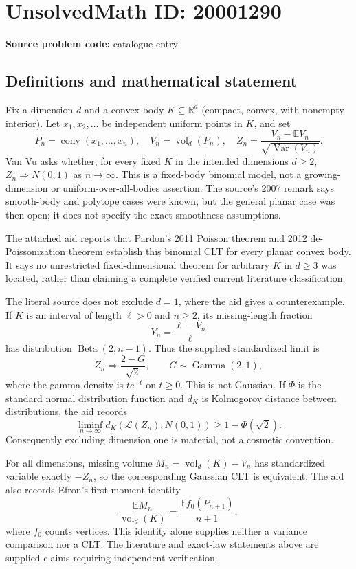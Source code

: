 \documentclass[11pt]{article}
\newcommand{\R}{\mathbb{R}}
\newcommand{\E}{\mathbb{E}}
\begin{document}
\section*{UnsolvedMath ID: 20001290}
\textbf{Source problem code:} catalogue entry
\subsection{Definitions and mathematical statement}
Fix a dimension $d$ and a convex body $K\subseteq\R^d$ (compact, convex, with nonempty interior). Let $x_1,x_2,\ldots$ be independent uniform points in $K$, and set
\[
 P_n=\operatorname{conv}(x_1,\ldots,x_n),\quad V_n=\operatorname{vol}_d(P_n),\quad
 Z_n=\frac{V_n-\E V_n}{\sqrt{\operatorname{Var}(V_n)}}.
\]
Van Vu asks whether, for every fixed $K$ in the intended dimensions $d\geq2$, $Z_n\Rightarrow N(0,1)$ as $n\to\infty$. This is a fixed-body binomial model, not a growing-dimension or uniform-over-all-bodies assertion. The source's 2007 remark says smooth-body and polytope cases were known, but the general planar case was then open; it does not specify the exact smoothness assumptions.

The attached aid reports that Pardon's 2011 Poisson theorem and 2012 de-Poissonization theorem establish this binomial CLT for every planar convex body. It says no unrestricted fixed-dimensional theorem for arbitrary $K$ in $d\geq3$ was located, rather than claiming a complete verified current literature classification.

The literal source does not exclude $d=1$, where the aid gives a counterexample. If $K$ is an interval of length $\ell>0$ and $n\geq2$, its missing-length fraction
\[
 Y_n=\frac{\ell-V_n}{\ell}
\]
has distribution $\operatorname{Beta}(2,n-1)$. Thus the supplied standardized limit is
\[
 Z_n\Rightarrow\frac{2-G}{\sqrt2},\qquad
 G\sim\operatorname{Gamma}(2,1),
\]
where the gamma density is $t e^{-t}$ on $t\geq0$. This is not Gaussian. If $\Phi$ is the standard normal distribution function and $d_K$ is Kolmogorov distance between distributions, the aid records
\[
 \liminf_{n\to\infty}d_K(\mathcal L(Z_n),N(0,1))\geq1-\Phi(\sqrt2).
\]
Consequently excluding dimension one is material, not a cosmetic convention.

For all dimensions, missing volume $M_n=\operatorname{vol}_d(K)-V_n$ has standardized variable exactly $-Z_n$, so the corresponding Gaussian CLT is equivalent. The aid also records Efron's first-moment identity
\[
 \frac{\E M_n}{\operatorname{vol}_d(K)}
 =\frac{\E f_0(P_{n+1})}{n+1},
\]
where $f_0$ counts vertices. This identity alone supplies neither a variance comparison nor a CLT. The literature and exact-law statements above are supplied claims requiring independent verification.
\end{document}
